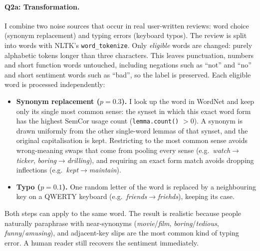 \providecommand{\todo}[1]{\textcolor{red}{[TODO: #1]}}


\paragraph{Q2a: Transformation.}
I combine two noise sources that occur in real user-written reviews: word choice
(synonym replacement) and typing errors (keyboard typos). The review is split into
words with NLTK's \texttt{word\_tokenize}. Only \emph{eligible} words are changed:
purely alphabetic tokens longer than three characters. This leaves punctuation,
numbers and short function words untouched, including negations such as
``not'' and ``no'' and short sentiment words such as ``bad'', so the label is
preserved. Each eligible word is processed independently:
\begin{itemize}
  \item \textbf{Synonym replacement ($p=0.3$).} I look up the word in WordNet and keep
  only its single most common sense: the synset in which this exact word form has the
  highest SemCor usage count (\texttt{lemma.count()} $>0$). A synonym is drawn uniformly
  from the other single-word lemmas of that synset, and the original capitalisation is
  kept. Restricting to the most common sense avoids wrong-meaning swaps that come from
  pooling every sense (e.g.\ \textit{watch}$\to$\textit{ticker},
  \textit{boring}$\to$\textit{drilling}), and requiring an exact form match avoids
  dropping inflections (e.g.\ \textit{kept}$\to$\textit{maintain}).
  \item \textbf{Typo ($p=0.1$).} One random letter of the word is replaced by a
  neighbouring key on a QWERTY keyboard (e.g.\ \textit{friends}$\to$\textit{friehds}),
  keeping its case.
\end{itemize}
Both steps can apply to the same word. The result is realistic because people
naturally paraphrase with near-synonyms (\textit{movie}/\textit{film},
\textit{boring}/\textit{tedious}, \textit{funny}/\textit{amusing}), and
adjacent-key slips are the most common kind of typing error. A human reader still
recovers the sentiment immediately.

